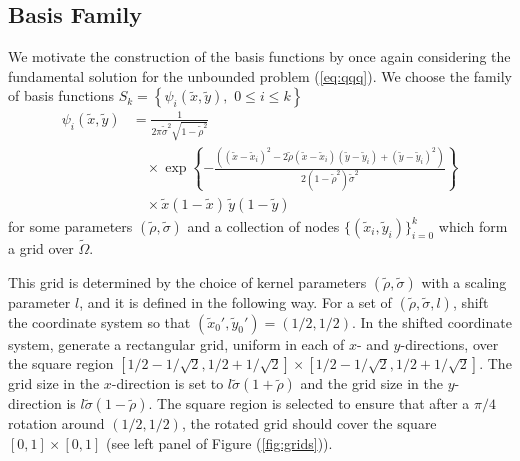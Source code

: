 \subsection{Basis Family}
We motivate the construction of the basis functions by
once again considering the fundamental solution for the unbounded
problem (\ref{eq:qqq}). We choose the family of basis functions
$S_k = \left\{\psi_i(\tilde{x},\tilde{y}), \,\, 0 \leq i \leq k \right\}$
\begin{align}
  \psi_i(\tilde{x},\tilde{y}) &= \frac{1}{2\pi \tilde{\sigma}^2\sqrt{1-\tilde{\rho}^2} } \\
                              &\quad \times \exp\left\{ -\frac{\left( (\tilde{x} - \tilde{x}_i)^2 - 2\tilde{\rho} (\tilde{x}-\tilde{x}_i)(\tilde{y}-\tilde{y}_i) + (\tilde{y} - \tilde{y}_i)^2 \right)}{2(1-\tilde{\rho}^2)\tilde{\sigma}^2}  \right\} \nonumber \\
  &\quad \times \tilde{x}\left(1-\tilde{x}\right)\, \tilde{y}(1-\tilde{y}) \nonumber
\end{align}
for some parameters $(\tilde{\rho}, \tilde{\sigma})$ and a collection of nodes
$\{ (\tilde{x}_i,\tilde{y}_i) \}_{i=0}^k$ which form a grid over
$\tilde{\Omega}$.

This grid is determined by the choice of kernel parameters
$(\tilde{\rho}, \tilde{\sigma})$ with a scaling parameter $l$, and it
is defined in the following way. For a set of
$(\tilde{\rho}, \tilde{\sigma}, l)$, shift the coordinate system so
that $(\tilde{x}_0', \tilde{y}_0') = (1/2,1/2)$. In the shifted
coordinate system, generate a rectangular grid, uniform in each of
$x$- and $y$-directions, over the square region
$[1/2 - 1/\sqrt{2}, 1/2+1/\sqrt{2}] \times [1/2 - 1/\sqrt{2},
1/2+1/\sqrt{2}]$. The grid size in the $x$-direction is set to
$l\tilde{\sigma}(1+\tilde{\rho})$ and the grid size in the
$y$-direction is $l\tilde{\sigma}(1-\tilde{\rho})$. The square region
is selected to ensure that after a $\pi/4$ rotation around
$(1/2, 1/2)$, the rotated grid should cover the square
$[0, 1] \times [0, 1]$ (see left panel of Figure (\ref{fig:grids})).

